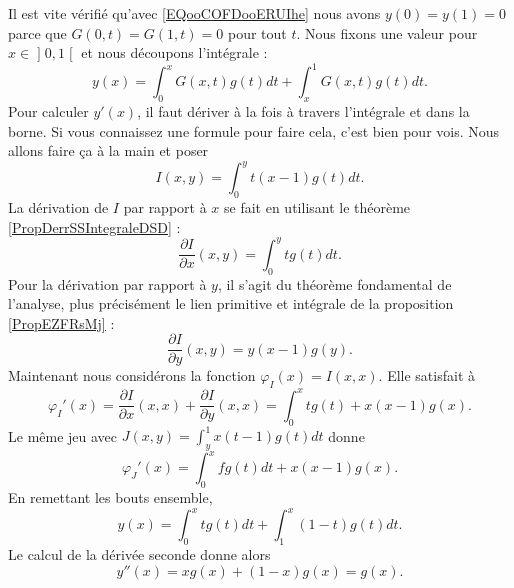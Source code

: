 \begin{subproof}
    Il est vite vérifié qu'avec \eqref{EQooCOFDooERUIhe} nous avons \( y(0)=y(1)=0\) parce que \( G(0,t)=G(1,t)=0\) pour tout \( t\). Nous fixons une valeur pour \( x\in \mathopen] 0 , 1 \mathclose[\) et nous découpons l'intégrale :
        \begin{equation}
            y(x)=\int_0^xG(x,t)g(t)dt+\int_x^1G(x,t)g(t)dt.
        \end{equation}
        Pour calculer \( y'(x)\), il faut dériver à la fois à travers l'intégrale et dans la borne. Si vous connaissez une formule pour faire cela, c'est bien pour vois. Nous allons faire ça à la main et poser
        \begin{equation}
            I(x,y)=\int_0^yt(x-1)g(t)dt.
        \end{equation}
        La dérivation de \( I\) par rapport à \( x\) se fait en utilisant le théorème \ref{PropDerrSSIntegraleDSD} :
        \begin{equation}
            \frac{ \partial I }{ \partial x }(x,y)=\int_0^ytg(t)dt.
        \end{equation}
        Pour la dérivation par rapport à \( y\), il s'agit du théorème fondamental de l'analyse, plus précisément le lien primitive et intégrale de la proposition \ref{PropEZFRsMj} :
        \begin{equation}
            \frac{ \partial I }{ \partial y }(x,y)=y(x-1)g(y).
        \end{equation}
        Maintenant nous considérons la fonction \( \varphi_I(x)=I(x,x)\). Elle satisfait à
        \begin{equation}
            \varphi_I'(x)=\frac{ \partial I }{ \partial x }(x,x)+\frac{ \partial I }{ \partial y }(x,x)=\int_0^xtg(t)+x(x-1)g(x).
        \end{equation}
        Le même jeu avec \( J(x,y)=\int_y^1x(t-1)g(t)dt\) donne
        \begin{equation}
                \varphi_J'(x)=\int_0^xfg(t)dt+x(x-1)g(x).
        \end{equation}
        En remettant les bouts ensemble,
        \begin{equation}
            y(x)=\int_0^xtg(t)dt+\int_1^x(1-t)g(t)dt.
        \end{equation}
        Le calcul de la dérivée seconde donne alors
        \begin{equation}
            y''(x)=xg(x)+(1-x)g(x)=g(x).
        \end{equation}
        

\end{subproof}
